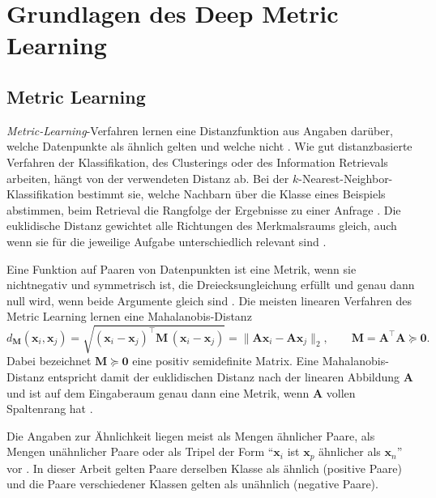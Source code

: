   \chapter{Grundlagen des Deep Metric Learning}
\label{chap:grundlagen}

\section{Metric Learning}
\label{sec:ml}

\emph{Metric-Learning}-Verfahren lernen eine Distanzfunktion aus Angaben darüber, welche Datenpunkte als ähnlich gelten und welche nicht \cite{bellet_survey_2014}. Wie gut distanzbasierte Verfahren der Klassifikation, des Clusterings oder des Information Retrievals arbeiten, hängt von der verwendeten Distanz ab. Bei der $k$-Nearest-Neighbor-Klassifikation bestimmt sie, welche Nachbarn über die Klasse eines Beispiels abstimmen, beim Retrieval die Rangfolge der Ergebnisse zu einer Anfrage \cite{bellet_survey_2014, weinberger_distance_2009}. Die euklidische Distanz gewichtet alle Richtungen des Merkmalsraums gleich, auch wenn sie für die jeweilige Aufgabe unterschiedlich relevant sind \cite{weinberger_distance_2009}.

Eine Funktion auf Paaren von Datenpunkten ist eine Metrik, wenn sie nichtnegativ und symmetrisch ist, die Dreiecksungleichung erfüllt und genau dann null wird, wenn beide Argumente gleich sind \cite{bellet_survey_2014, weinberger_distance_2009}. Die meisten linearen Verfahren des Metric Learning lernen eine Mahalanobis-Distanz \cite{bellet_survey_2014, weinberger_distance_2009}
\begin{equation}
  d_{\bm{M}}(\bm{x}_i,\bm{x}_j)=\sqrt{(\bm{x}_i-\bm{x}_j)^{\top}\bm{M}\,(\bm{x}_i-\bm{x}_j)}
  =\lVert\bm{A}\bm{x}_i-\bm{A}\bm{x}_j\rVert_2,
  \qquad \bm{M}=\bm{A}^{\top}\bm{A}\succeq\bm{0}.
  \label{eq:mahalanobis}
\end{equation}
Dabei bezeichnet $\bm{M}\succeq\bm{0}$ eine positiv semidefinite Matrix. Eine Mahalanobis-Distanz entspricht damit der euklidischen Distanz nach der linearen Abbildung $\bm{A}$ und ist auf dem Eingaberaum genau dann eine Metrik, wenn $\bm{A}$ vollen Spaltenrang hat \cite{bellet_survey_2014, weinberger_distance_2009}.

Die Angaben zur Ähnlichkeit liegen meist als Mengen ähnlicher Paare, als Mengen unähnlicher Paare oder als Tripel der Form \enquote{$\bm{x}_i$ ist $\bm{x}_p$ ähnlicher als $\bm{x}_n$} vor \cite{bellet_survey_2014}. In dieser Arbeit gelten Paare derselben Klasse als ähnlich (positive Paare) und die Paare verschiedener Klassen gelten als unähnlich (negative Paare).


